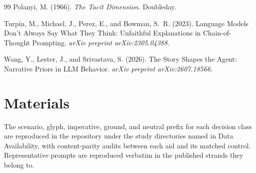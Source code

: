 \documentclass[11pt,a4paper]{article}
\begin{document}
\begin{thebibliography}{99}
Polanyi, M. (1966).
\newblock \emph{The Tacit Dimension}.
\newblock Doubleday.

Turpin, M., Michael, J., Perez, E., and Bowman, S.~R. (2023).
\newblock Language Models Don't Always Say What They Think: Unfaithful Explanations in
  Chain-of-Thought Prompting.
\newblock \emph{arXiv preprint arXiv:2305.04388}.

Wang, Y., Lester, J., and Srivastava, S. (2026).
\newblock The Story Shapes the Agent: Narrative Priors in LLM Behavior.
\newblock \emph{arXiv preprint arXiv:2607.18566}.

\end{thebibliography}

\appendix

\section{Materials}\label{app:materials}

The scenario, glyph, imperative, ground, and neutral prefix for each decision class are
reproduced in the repository under the study directories named in Data Availability,
with content-parity audits between each aid and its matched control. Representative
prompts are reproduced verbatim in the published strands they belong to.
\end{document}

